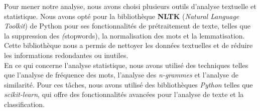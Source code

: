\vspace{\baselineskip}
\hspace{0,5cm}Pour mener notre analyse, nous avons choisi plusieurs outils d'analyse textuelle
et statistique. Nous avons opté pour la bibliothèque \textbf{NLTK} (\textit{Natural Language
Toolkit}) de Python pour ses fonctionnalités de prétraitement de texte, telles
que la suppression des \textit(stopwords), la normalisation des mots et la lemmatisation.
Cette bibliothèque nous a permis de nettoyer les données textuelles et de
réduire les informations redondantes ou inutiles.
\\En ce qui concerne l'analyse statistique, nous avons utilisé des techniques
telles que l'analyse de fréquence des mots, l'analyse des \textit{n-grammes} et l'analyse
de similarité. Pour ces tâches, nous avons utilisé des bibliothèques \textit{Python}
telles que \textit{scikit-learn}, qui offre des fonctionnalités avancées pour l'analyse
de texte et la classification.
